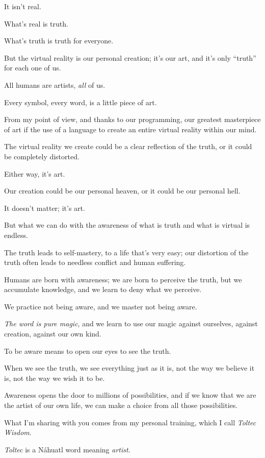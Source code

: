 \documentclass{article}
\numberwithin{equation}{section}
\begin{document}
It isn't real.

What's real is truth.

What's truth is truth for everyone.

But the virtual reality is our personal creation; it's our art, and it's only ``truth'' for each one of us.

All humans are artists, \textit{all} of us.

Every symbol, every word, is a little piece of art.

From my point of view, and thanks to our programming, our greatest masterpiece of art if the use of a language to create an entire virtual reality within our mind.

The virtual reality we create could be a clear reflection of the truth, or it could be completely distorted.

Either way, it's art.

Our creation could be our personal heaven, or it could be our personal hell.

It doesn't matter; it's art.

But what we can do with the awareness of what is truth and what is virtual is endless.

The truth leads to self-mastery, to a life that's very easy; our distortion of the truth often leads to needless conflict and human suffering.


%
Humans are born with awareness; we are born to perceive the truth, but we accumulate knowledge, and we learn to deny what we perceive.

We practice not being aware, and we master not being aware.

\textit{The word is pure magic}, and we learn to use our magic against ourselves, against creation, against our own kind.

To be aware means to open our eyes to see the truth.

When we see the truth, we see everything just as it is, not the way we believe it is, not the way we wish it to be.

Awareness opens the door to millions of possibilities, and if we know that we are the artist of our own life, we can make a choice from all those possibilities.

%
What I'm sharing with you comes from my personal training, which I call \textit{Toltec Wisdom}.

\textit{Toltec} is a N\'ahuatl word meaning \textit{artist}.
\end{document}
